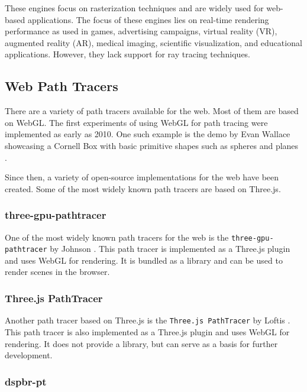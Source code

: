These engines focus on rasterization techniques and are widely used for web-based applications. The focus of these engines lies on real-time rendering performance as used in games, advertising campaigns, virtual reality (VR), augmented reality (AR), medical imaging, scientific visualization, and educational applications. However, they lack support for ray tracing techniques. 

\subsection*{Web Path Tracers}

There are a variety of path tracers available for the web. Most of them are based on WebGL. The first experiments of using WebGL for path tracing were implemented as early as 2010. One such example is the demo by Evan Wallace showcasing a Cornell Box with basic primitive shapes such as spheres and planes \cite{pathTracerWallace}.

Since then, a variety of open-source implementations for the web have been created. Some of the most widely known path tracers are based on \gls{Three.js}.

\subsubsection{three-gpu-pathtracer}

One of the most widely known path tracers for the web is the \texttt{three-gpu-pathtracer} by Johnson \cite{ThreeJsPathTracerJohnson}. This path tracer is implemented as a \gls{Three.js} plugin and uses WebGL for rendering.  It is bundled as a library and can be used to render scenes in the browser.

\subsubsection{Three.js PathTracer}

Another path tracer based on \gls{Three.js} is the \texttt{Three.js PathTracer} by Loftis \cite{ThreeJsPathTracerLoftis}. This path tracer is also implemented as a \gls{Three.js} plugin and uses WebGL for rendering. It does not provide a library, but can serve as a basis for further development.

\subsubsection{dspbr-pt}

